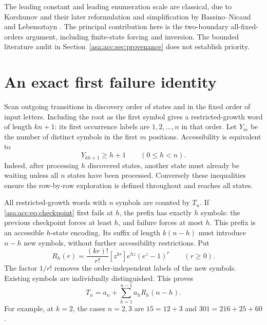 \documentclass[11pt,letterpaper]{article}
\theoremstyle{remark}\newtheorem{remark}[theorem]{Remark}
\numberwithin{equation}{section}
\begin{document}
The leading constant and leading enumeration scale are classical, due to Korshunov and their later reformulation and simplification by Bassino--Nicaud and Lebensztayn \cite{korshunov1978,bassino,lebensztayn}. The principal contribution here is the two-boundary all-fixed-orders argument, including finite-state forcing and inversion. The bounded literature audit in Section~\ref{asa:acc:sec:provenance} does not establish priority.

\section{An exact first failure identity}
Scan outgoing transitions in discovery order of states and in the fixed order of input letters. Including the root as the first symbol gives a restricted-growth word of length $kn+1$: its first occurrence labels are $1,2,\ldots,n$ in that order. Let $Y_m$ be the number of distinct symbols in the first $m$ positions. Accessibility is equivalent to
\begin{equation}\label{asa:acc:eq:checkpoint}
Y_{kh+1}\ge h+1\qquad(0\le h<n).
\end{equation}
Indeed, after processing $h$ discovered states, another state must already be waiting unless all $n$ states have been processed. Conversely these inequalities ensure the row-by-row exploration is defined throughout and reaches all states.

All restricted-growth words with $n$ symbols are counted by $T_n$. If \eqref{asa:acc:eq:checkpoint} first fails at $h$, the prefix has exactly $h$ symbols: the previous checkpoint forces at least $h$, and failure forces at most $h$. This prefix is an accessible $h$-state encoding. Its suffix of length $k(n-h)$ must introduce $n-h$ new symbols, without further accessibility restrictions. Put
\begin{equation}\label{asa:acc:eq:R}
R_h(r)=\frac{(kr)!}{r!}[z^{kr}]e^{hz}(e^z-1)^r\qquad(r\ge0).
\end{equation}
The factor $1/r!$ removes the order-independent labels of the new symbols. Existing symbols are individually distinguished. This proves
\begin{equation}\label{asa:acc:eq:renewal}
T_n=a_n+\sum_{h=1}^{n-1}a_h R_h(n-h).
\end{equation}
For example, at $k=2$, the cases $n=2,3$ are $15=12+3$ and $301=216+25+60$.
\end{document}
